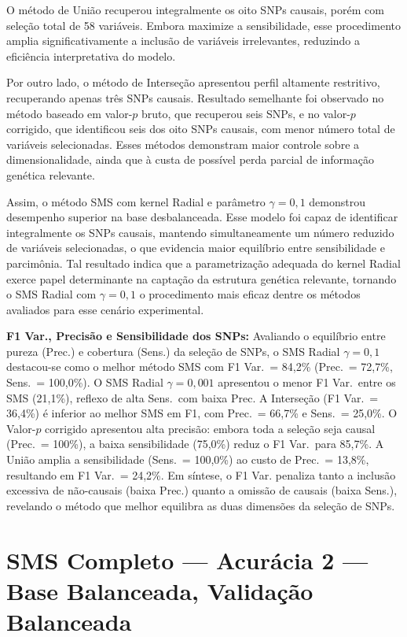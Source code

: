 \documentclass[
    12pt,
    a4paper,
    oneside,
    english,
    french,
    spanish,
    brazil
    ]{abntex2}
\newcommand{\novo}[1]{\textcolor{corNova}{#1}}
\begin{document}
O método de União recuperou integralmente os oito SNPs causais, porém com seleção total de 58 variáveis. Embora maximize a sensibilidade, esse procedimento amplia significativamente a inclusão de variáveis irrelevantes, reduzindo a eficiência interpretativa do modelo.

Por outro lado, o método de Interseção apresentou perfil altamente restritivo, recuperando apenas três SNPs causais. Resultado semelhante foi observado no método baseado em valor-$p$ bruto, que recuperou seis SNPs, e no valor-$p$ corrigido, que identificou seis dos oito SNPs causais, com menor número total de variáveis selecionadas. Esses métodos demonstram maior controle sobre a dimensionalidade, ainda que à custa de possível perda parcial de informação genética relevante.

Assim, o método SMS com kernel Radial e parâmetro $\gamma = 0{,}1$ demonstrou desempenho superior na base desbalanceada. Esse modelo foi capaz de identificar integralmente os SNPs causais, mantendo simultaneamente um número reduzido de variáveis selecionadas, o que evidencia maior equilíbrio entre sensibilidade e parcimônia. Tal resultado indica que a parametrização adequada do kernel Radial exerce papel determinante na captação da estrutura genética relevante, tornando o SMS Radial com $\gamma = 0{,}1$ o procedimento mais eficaz dentre os métodos avaliados para esse cenário experimental.


\novo{\textbf{F1 Var., Precisão e Sensibilidade dos SNPs:} Avaliando o equilíbrio entre pureza (Prec.) e cobertura (Sens.) da seleção de SNPs, o SMS Radial $\gamma=0{,}1$ destacou-se como o melhor método SMS com F1 Var.\ = 84,2\% (Prec.\ = 72,7\%, Sens.\ = 100,0\%). O SMS Radial $\gamma=0{,}001$ apresentou o menor F1 Var.\ entre os SMS (21,1\%), reflexo de alta Sens.\ com baixa Prec. A Interseção (F1 Var.\ = 36,4\%) é inferior ao melhor SMS em F1, com Prec.\ = 66,7\% e Sens.\ = 25,0\%. O Valor-$p$ corrigido apresentou alta precisão: embora toda a seleção seja causal (Prec.\ = 100\%), a baixa sensibilidade (75,0\%) reduz o F1 Var.\ para 85,7\%. A União amplia a sensibilidade (Sens.\ = 100,0\%) ao custo de Prec.\ = 13,8\%, resultando em F1 Var.\ = 24,2\%. Em síntese, o F1 Var. penaliza tanto a inclusão excessiva de não-causais (baixa Prec.) quanto a omissão de causais (baixa Sens.), revelando o método que melhor equilibra as duas dimensões da seleção de SNPs.}
\section{SMS Completo --- Acurácia 2 --- Base Balanceada, Validação Balanceada}
\end{document}
